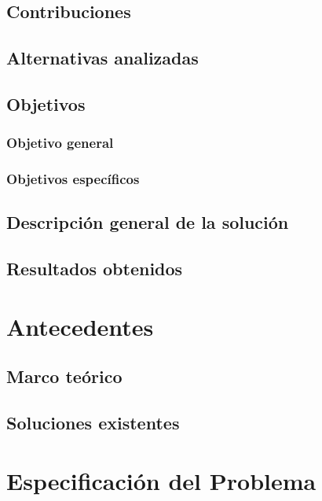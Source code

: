 \documentclass[upright, contnum]{umemoria}
\begin{document}
{   

\section{Contribuciones}
\label{sec-1.3}

\section{Alternativas analizadas}
\label{sec-1.4}

\section{Objetivos}
\label{sec-1.5}

\subsection{Objetivo general}
\label{sec-1.5.1}

\subsection{Objetivos específicos}
\label{sec-1.5.2}

\section{Descripción general de la solución}
\label{sec-1.6}

\section{Resultados obtenidos}
\label{sec-1.7}


\chapter{Antecedentes}
\label{sec-2}

\section{Marco teórico}
\label{sec-2.1}

\section{Soluciones existentes}
\label{sec-2.2}


\chapter{Especificación del Problema}
\label{sec-3}

}
\end{document}
